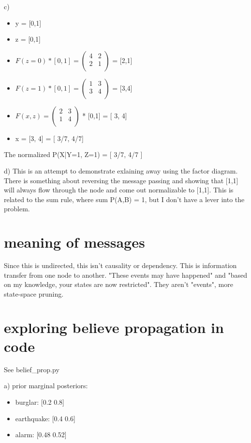 \documentclass[11pt]{article}
\begin{document}
c) 
\begin{itemize}
	\item y = [0,1]
	\item z = [0,1]
	\item ${F(z=0) * [0,1] = 
		\begin{pmatrix}
			4 & 2 \\
			2 & 1 \\
		\end{pmatrix}
	}$ = [2,1]
	\item ${F(z=1) * [0,1] = 
		\begin{pmatrix}
			1 & 3 \\
			3 & 4 \\
	\end{pmatrix}}$ = [3,4]
	\item ${F(x,z) = 
		\begin{pmatrix}
		2 & 3 \\
		1 & 4 \\
		\end{pmatrix}
	}$ * [0,1] = [ 3, 4]
	\item x = [3, 4] = [ 3/7, 4/7]
\end{itemize}

The normalized P(X|Y=1, Z=1) = [ 3/7, 4/7 ]

d) This is an attempt to demonstrate exlaining away using the factor diagram. There is something about reversing the message passing and showing that [1,1] will always flow through the node and come out normalizable to [1,1]. This is related to the sum rule, where sum P(A,B) = 1, but I don't have a lever into the problem.

\section{meaning of messages}

Since this is undirected, this isn't causality or dependency. This is information transfer from one node to another. "These events may have happened" and "based on my knowledge, your states are now restricted". They aren't "events", more state-space pruning.

\section{exploring believe propagation in code}

See belief\_prop.py

a) prior marginal posteriors: 
\begin{itemize}
	\item burglar:    [0.2 0.8]
	\item earthquake: [0.4 0.6]
	\item alarm:      [0.48 0.52]	
\end{itemize}
\end{document}
